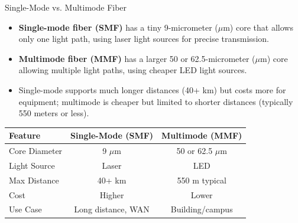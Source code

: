 \documentclass[aspectratio=169]{beamer}
\begin{document}
\begin{frame}{Single-Mode vs. Multimode Fiber}
    \begin{itemize}
        \item \textbf{Single-mode fiber (SMF)} has a tiny 9-micrometer ($\mu$m) core that allows only one light path, using laser light sources for precise transmission.
        \item \textbf{Multimode fiber (MMF)} has a larger 50 or 62.5-micrometer ($\mu$m) core allowing multiple light paths, using cheaper LED light sources.
        \item Single-mode supports much longer distances (40+ km) but costs more for equipment; multimode is cheaper but limited to shorter distances (typically 550 meters or less).
    \end{itemize}
    
    \vspace{0.3cm}
    \begin{table}
        \centering
        \small
        \begin{tabular}{|l|c|c|}
            \hline
            \rowcolor{networkblue!20}
            \textbf{Feature} & \textbf{Single-Mode (SMF)} & \textbf{Multimode (MMF)} \\
            \hline
            Core Diameter & 9 $\mu$m & 50 or 62.5 $\mu$m \\
            \hline
            Light Source & Laser & LED \\
            \hline
            Max Distance & 40+ km & 550 m typical \\
            \hline
            Cost & Higher & Lower \\
            \hline
            Use Case & Long distance, WAN & Building/campus \\
            \hline
        \end{tabular}
    \end{table}
\end{frame}
\end{document}
